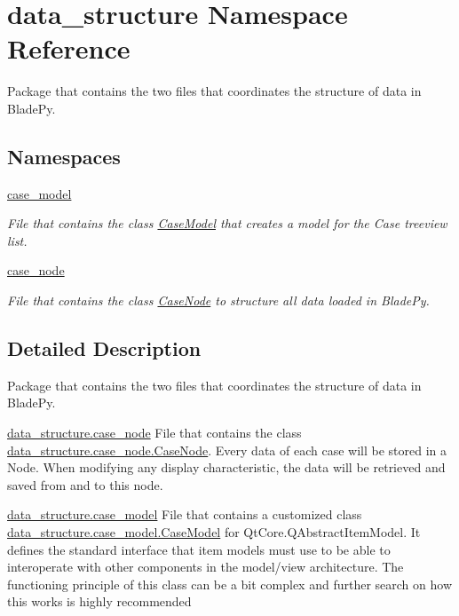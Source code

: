 \hypertarget{namespacedata__structure}{}\section{data\+\_\+structure Namespace Reference}
\label{namespacedata__structure}


Package that contains the two files that coordinates the structure of data in Blade\+Py.  


\subsection*{Namespaces}
\begin{DoxyCompactItemize}
\item 
 \hyperlink{namespacedata__structure_1_1case__model}{case\+\_\+model}
\begin{DoxyCompactList}\small\item\em File that contains the class \hyperlink{classdata__structure_1_1case__model_1_1_case_model}{Case\+Model} that creates a model for the Case treeview list. \end{DoxyCompactList}\item 
 \hyperlink{namespacedata__structure_1_1case__node}{case\+\_\+node}
\begin{DoxyCompactList}\small\item\em File that contains the class \hyperlink{classdata__structure_1_1case__node_1_1_case_node}{Case\+Node} to structure all data loaded in Blade\+Py. \end{DoxyCompactList}\end{DoxyCompactItemize}


\subsection{Detailed Description}
Package that contains the two files that coordinates the structure of data in Blade\+Py. 

\begin{DoxyItemize}
\item {\ttfamily \hyperlink{namespacedata__structure_1_1case__node}{data\+\_\+structure.\+case\+\_\+node}} File that contains the class \hyperlink{classdata__structure_1_1case__node_1_1_case_node}{data\+\_\+structure.\+case\+\_\+node.\+Case\+Node}. Every data of each case will be stored in a Node. When modifying any display characteristic, the data will be retrieved and saved from and to this node.\end{DoxyItemize}
\begin{DoxyItemize}
\item {\ttfamily \hyperlink{namespacedata__structure_1_1case__model}{data\+\_\+structure.\+case\+\_\+model}} File that contains a customized class \hyperlink{classdata__structure_1_1case__model_1_1_case_model}{data\+\_\+structure.\+case\+\_\+model.\+Case\+Model} for Qt\+Core.\+Q\+Abstract\+Item\+Model. It defines the standard interface that item models must use to be able to interoperate with other components in the model/view architecture. The functioning principle of this class can be a bit complex and further search on how this works is highly recommended \end{DoxyItemize}
